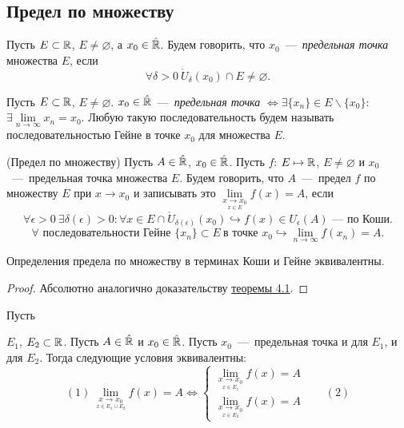 \subsection{Предел по множеству}

\begin{definition}
    Пусть $E \subset \mathbb{R}$, $E \neq \varnothing$, а $x_{0} \in \Hat{\mathbb{R}}$. Будем говорить, что $x_{0}$~---~\textit{предельная точка} множества $E$, если
    $$ \forall \delta > 0 \  \mathring{U}_{\delta} (x_{0}) \cap E \neq \varnothing.$$
\end{definition}
\begin{lemma}
    Пусть $E \subset \mathbb{R}$, $E \neq \varnothing$. $x_{0} \in \Hat{\mathbb{R}}$~---~\textit{предельная точка} $\Leftrightarrow \exists \{ x_{n} \} \in E \backslash \{ x_{0} \}$: $\exists \lim\limits_{n\to \infty} x_{n} = x_{0}$. Любую такую последовательность будем называть последовательностью Гейне в точке $x_{0}$ для множества $E$.
\end{lemma}
\begin{definition}
    (Предел по множеству) Пусть $A \in \Hat{\mathbb{R}}$, $x_{0} \in \Hat{\mathbb{R}}$. Пусть $f$: $E \mapsto \mathbb{R}$, $E \neq \varnothing$ и $x_{0}$~---~предельная точка множества $E$. Будем говорить, что $A$~---~предел $f$ по множеству $E$ при $x \to x_{0}$ и записывать это $\lim\limits_{\underset{x \in E}{x\to x_{0}}} f (x) = A$, если
    $$ \forall \epsilon > 0 \  \exists \delta (\epsilon) > 0: \forall x \in E \cap  \mathring{U}_{\delta (\epsilon)} (x_{0}) \hookrightarrow f (x) \in U_{\epsilon} (A) \text{~---~по Коши.}$$
    $$ \forall \text{ последовательности Гейне }\{ x_{n}\} \subset E \  \text{в точке } x_{0} \hookrightarrow \lim\limits_{n\to \infty} f (x_{n}) = A.$$
\end{definition}
\begin{theorem}
    Определения предела по множеству в терминах Коши и Гейне эквивалентны.
\end{theorem}
\begin{proof}
    Абсолютно аналогично доказательству \hyperlink{thm4.1}{теоремы 4.1}.
\end{proof}
\begin{lemma}
    \hypertarget{lemm4.2}{Пусть} $E_{1}$, $E_{2} \subset \mathbb{R}$. Пусть $A \in \Hat{\mathbb{R}}$ и $x_{0} \in \Hat{\mathbb{R}}$. Пусть $x_{0}$~---~предельная точка и для $E_{1}$, и для $E_{2}$. Тогда следующие условия эквивалентны:
    $$ (1) \  \lim\limits_{\underset{x \in E_{1} \cup E_{2}}{x\to x_{0}}} f (x) = A \Leftrightarrow 
    \begin{cases}
            \lim\limits_{\underset{x \in E_{1}}{x\to x_{0}}} f (x) = A\\
            \lim\limits_{\underset{x \in E_{2}}{x\to x_{0}}} f (x) = A& 
        \end{cases}
        \quad (2)
    $$
\end{lemma}

